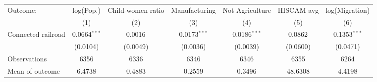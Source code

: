 \begin{tabular}{lcccccc}
  \toprule
  Outcome: & log(Pop.) & Child-women ratio & Manufacturing & Not Agriculture & HISCAM avg & log(Migration) \\
           & (1) & (2) & (3) & (4) & (5) & (6) \\
  \midrule
  Connected railroad &  0.0664$^{***}$ & 0.0016$^{}$ & 0.0173$^{***}$ & 0.0186$^{***}$ & 0.0862$^{}$ & 0.1353$^{***}$  \\
                    &  (0.0104) & (0.0049) & (0.0036) & (0.0039) & (0.0600) & (0.0471)  \\
  \cmidrule(lr){2-7}
  Observations      &  6356 & 6336 & 6346 & 6346 & 6355 & 6264  \\
  Mean of outcome   &  6.4738 & 0.4883 & 0.2559 & 0.3496 & 48.6308 & 4.4198  \\
  \bottomrule
\end{tabular}
